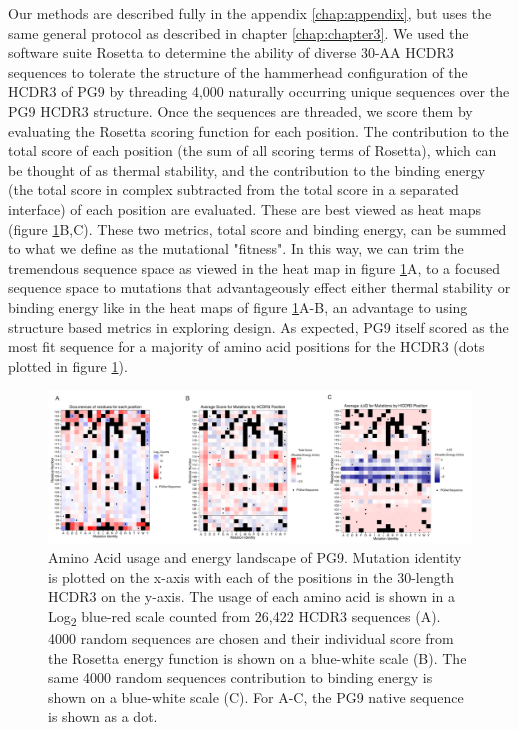 Our methods are described fully in the appendix \ref{chap:appendix}, but uses the same general protocol as described in chapter \ref{chap:chapter3}. We used the software suite Rosetta to determine the ability of diverse 30-AA HCDR3 sequences to tolerate the structure of the hammerhead configuration of the HCDR3 of PG9 by threading 4,000 naturally occurring unique sequences over the PG9 HCDR3 structure. Once the sequences are threaded, we score them by evaluating the Rosetta scoring function for each position. The contribution to the total score of each position (the sum of all scoring terms of Rosetta), which can be thought of as thermal stability, and the contribution to the binding energy (the total score in complex subtracted from the total score in a separated interface) of each position are evaluated. These are best viewed as heat maps (figure \ref{fig:figure4_2}B,C). These two metrics, total score and binding energy, can be summed to what we define as the mutational "fitness". In this way, we can trim the tremendous sequence space as viewed in the heat map in figure \ref{fig:figure4_2}A, to a focused sequence space to mutations that advantageously effect either thermal stability or binding energy like in the heat maps of figure \ref{fig:figure4_2}A-B, an advantage to using structure based metrics in exploring design. As expected, PG9 itself scored as the most fit sequence for a majority of amino acid positions for the HCDR3 (dots plotted in figure \ref{fig:figure4_2}).

\begin{figure}
   \centering
   \includegraphics[width=.99\textwidth]{images/chapter4/figure4_2.pdf} %
   \caption[Amino Acid Usage and Energy Landscape of PG9]{Amino Acid usage and energy landscape of PG9. Mutation identity is plotted on the x-axis with each of the positions in the 30-length HCDR3 on the y-axis. The usage of each amino acid is shown in a Log\textsubscript{2} blue-red scale counted from 26,422 HCDR3 sequences (A). 4000 random sequences are chosen and their individual score from the Rosetta energy function is shown on a blue-white scale (B).  The same 4000 random sequences contribution to binding energy is shown on a blue-white scale (C). For A-C, the PG9 native sequence is shown as a dot.
}
   \label{fig:figure4_2}
\end{figure}

